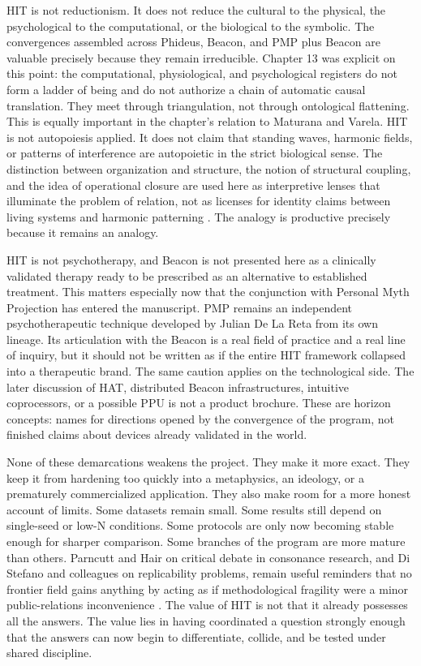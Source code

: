 HIT is not reductionism. It does not reduce the cultural to the physical, the psychological to the computational, or the biological to the symbolic. The convergences assembled across Phideus, Beacon, and PMP plus Beacon are valuable precisely because they remain irreducible. Chapter 13 was explicit on this point: the computational, physiological, and psychological registers do not form a ladder of being and do not authorize a chain of automatic causal translation. They meet through triangulation, not through ontological flattening. This is equally important in the chapter's relation to Maturana and Varela. HIT is not autopoiesis applied. It does not claim that standing waves, harmonic fields, or patterns of interference are autopoietic in the strict biological sense. The distinction between organization and structure, the notion of structural coupling, and the idea of operational closure are used here as interpretive lenses that illuminate the problem of relation, not as licenses for identity claims between living systems and harmonic patterning \parencite{maturana_varela_1987}. The analogy is productive precisely because it remains an analogy.

HIT is not psychotherapy, and Beacon is not presented here as a clinically validated therapy ready to be prescribed as an alternative to established treatment. This matters especially now that the conjunction with Personal Myth Projection has entered the manuscript. PMP remains an independent psychotherapeutic technique developed by Julian De La Reta from its own lineage. Its articulation with the Beacon is a real field of practice and a real line of inquiry, but it should not be written as if the entire HIT framework collapsed into a therapeutic brand. The same caution applies on the technological side. The later discussion of HAT, distributed Beacon infrastructures, intuitive coprocessors, or a possible PPU is not a product brochure. These are horizon concepts: names for directions opened by the convergence of the program, not finished claims about devices already validated in the world.

None of these demarcations weakens the project. They make it more exact. They keep it from hardening too quickly into a metaphysics, an ideology, or a prematurely commercialized application. They also make room for a more honest account of limits. Some datasets remain small. Some results still depend on single-seed or low-N conditions. Some protocols are only now becoming stable enough for sharper comparison. Some branches of the program are more mature than others. Parncutt and Hair on critical debate in consonance research, and Di Stefano and colleagues on replicability problems, remain useful reminders that no frontier field gains anything by acting as if methodological fragility were a minor public-relations inconvenience \parencite{parncutt_2011,distefano_2017}. The value of HIT is not that it already possesses all the answers. The value lies in having coordinated a question strongly enough that the answers can now begin to differentiate, collide, and be tested under shared discipline.
